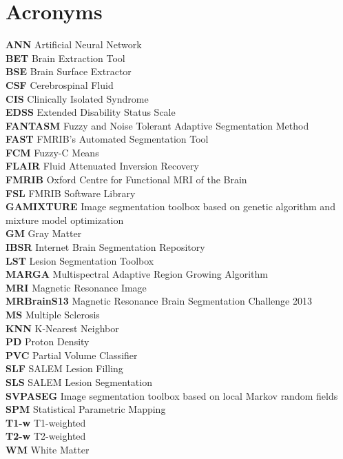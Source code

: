 
\chapter*{Acronyms}

\textbf{ANN} Artificial Neural Network\\
\textbf{BET} Brain Extraction Tool\\
\textbf{BSE} Brain Surface Extractor\\
\textbf{CSF} Cerebrospinal Fluid\\
\textbf{CIS} Clinically Isolated Syndrome\\
\textbf{EDSS} Extended Disability Status Scale\\
\textbf{FANTASM} Fuzzy and Noise Tolerant Adaptive Segmentation Method\\
\textbf{FAST} FMRIB's Automated Segmentation Tool\\
\textbf{FCM} Fuzzy-C Means \\
\textbf{FLAIR} Fluid Attenuated Inversion Recovery\\
\textbf{FMRIB} Oxford Centre for Functional MRI of the Brain \\
\textbf{FSL} FMRIB Software Library\\
\textbf{GAMIXTURE} Image segmentation toolbox based on genetic algorithm and mixture model optimization\\
\textbf{GM} Gray Matter\\
\textbf{IBSR} Internet Brain Segmentation Repository\\
\textbf{LST} Lesion Segmentation Toolbox\\
\textbf{MARGA} Multispectral Adaptive Region Growing Algorithm \\
\textbf{MRI} Magnetic Resonance Image\\
\textbf{MRBrainS13} Magnetic Resonance Brain Segmentation Challenge 2013\\
\textbf{MS} Multiple Sclerosis\\
\textbf{KNN} K-Nearest Neighbor \\
\textbf{PD} Proton Density\\
\textbf{PVC} Partial Volume Classifier \\
\textbf{SLF} SALEM Lesion Filling \\
\textbf{SLS} SALEM Lesion Segmentation \\
\textbf{SVPASEG} Image segmentation toolbox based on local Markov random fields\\
\textbf{SPM} Statistical Parametric Mapping\\
\textbf{T1-w} T1-weighted\\
\textbf{T2-w} T2-weighted\\
\textbf{WM} White Matter\\





